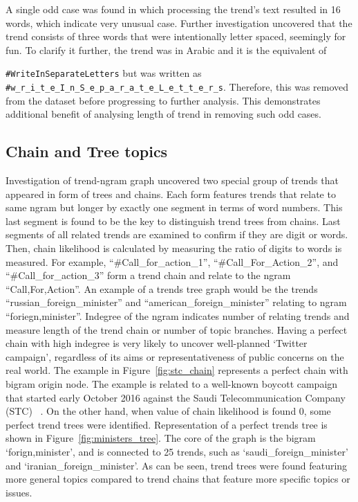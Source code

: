 \documentclass[conference]{IEEEtran}
\begin{document}
A single odd case was found in which processing the trend’s text
resulted in 16 words, which indicate very unusual case. Further
investigation uncovered that the trend consists of three words that
were intentionally letter spaced, seemingly for fun. To clarify it
further, the trend was in Arabic and it is the equivalent of
{\texttt{\#WriteInSeparateLetters} but was written as
{\footnotesize{{\texttt{\#w\_r\_i\_t\_e\_I\_n\_S\_e\_p\_a\_r\_a\_t\_e\_L\_e\_t\_t\_e\_r\_s}}}}.
Therefore, this was removed from the dataset before progressing to
further analysis. This demonstrates additional benefit of analysing
length of trend in removing such odd cases.

\subsection{Chain and Tree topics}

Investigation of trend-ngram graph uncovered two special group of trends 
that appeared in form of trees and chains. 
Each form features trends that relate to same ngram but longer by exactly 
one segment in terms of word numbers. This last segment is found to be 
the key to distinguish trend trees from chains. Last segments of all related 
trends are examined to confirm if they are digit or words. Then, chain 
likelihood is calculated by measuring the ratio of digits to words is measured. 
For example, “\#Call\_for\_action\_1”, “\#Call\_For\_Action\_2”, and 
“\#Call\_for\_action\_3” 
form a trend chain and relate to the ngram “Call,For,Action”. An example 
of a trends tree graph would be the trends “russian\_foreign\_minister” and 
“american\_foreign\_minister” relating to ngram “foriegn,minister”. Indegree of 
the ngram indicates number of relating trends and measure length of the 
trend chain or number of topic branches. Having a perfect chain with high indegree 
is very likely to uncover well-planned ‘Twitter campaign’, regardless 
of its aims or representativeness of public concerns on the real world.
The example in Figure~\ref{fig:stc_chain} represents a perfect chain with bigram 
origin node. The example is related to a well-known boycott campaign that 
started early October 2016 against the Saudi Telecommunication Company (STC) ~\cite{naffee-2016}.
On the other hand, when value of chain 
likelihood is found 0, some perfect trend trees were identified. 
Representation of a perfect trends tree is shown in Figure~\ref{fig:ministers_tree}. 
The core of the graph is the bigram ‘forign,minister’, and is connected to 25 
trends, such as ‘saudi\_foreign\_minister’ and ‘iranian\_foreign\_minister’. As can be seen, 
trend trees were found featuring more general topics compared to trend 
chains that feature more specific topics or issues.

}
\end{document}
